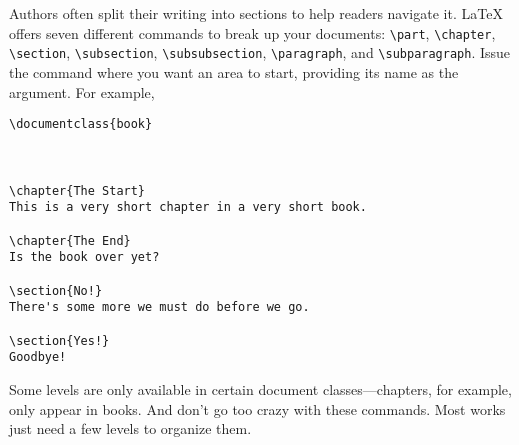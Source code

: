 Authors often split their writing into sections to help readers navigate it.
\LaTeX{} offers seven different commands to break up your documents:
\verb|\part|, \verb|\chapter|, \verb|\section|, \verb|\subsection|,
\verb|\subsubsection|, \verb|\paragraph|, and \verb|\subparagraph|.
Issue the command where you want an area to start,
providing its name as the argument.
For example,
\begin{leftfigure}
\begin{lstlisting}
\documentclass{book}



\chapter{The Start}
This is a very short chapter in a very short book.

\chapter{The End}
Is the book over yet?

\section{No!}
There's some more we must do before we go.

\section{Yes!}
Goodbye!

\end{lstlisting}
\end{leftfigure}
Some levels are only available in certain document classes---chapters,
for example, only appear in books.
And don't go too crazy with these commands.
Most works just need a few levels to organize them.

